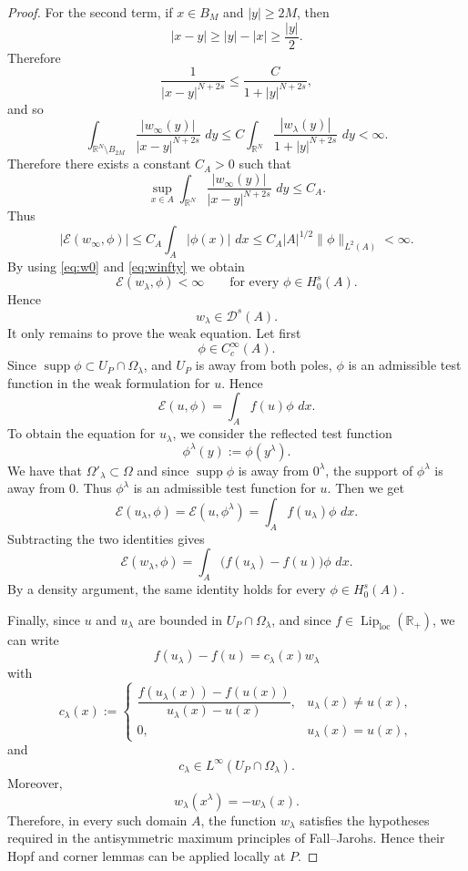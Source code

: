 \documentclass[11pt,a4paper]{article}
\newcommand{\dd}{\,d}
\newcommand{\supp}{\operatorname{supp}}
\newcommand{\Lip}{\operatorname{Lip}}
\newcommand{\loc}{\mathrm{loc}}
\begin{document}
\begin{proof}
For the second term, if \(x\in B_M\) and \(|y|\ge 2M\), then
\[
|x-y|\ge |y|-|x|\ge \frac{|y|}{2}.
\]
Therefore
\[
\frac1{|x-y|^{N+2s}}
\le
\frac{C}{1+|y|^{N+2s}},
\]
and so
\[
\int_{\mathbb R^N\setminus B_{2M}}
\frac{|w_\infty(y)|}{|x-y|^{N+2s}}\,\dd y
\le
C
\int_{\mathbb R^N}
\frac{|w_\lambda(y)|}{1+|y|^{N+2s}}\,\dd y
<\infty.
\]
Therefore there exists a constant \(C_{A}>0\) such that
\[
\sup_{x\in A}
\int_{\mathbb R^N}
\frac{|w_\infty(y)|}{|x-y|^{N+2s}}\,\dd y
\le C_{A}.
\]
Thus
\begin{equation}\label{eq:winfty}
|\mathcal E(w_\infty,\phi)|
\le
C_{A}\int_{A}|\phi(x)|\,\dd x
\le
C_{A}|A|^{1/2}\|\phi\|_{L^2(A)}
<\infty.
\end{equation}
By using \eqref{eq:w0} and \eqref{eq:winfty} we obtain
\[
\mathcal E(w_\lambda,\phi)<\infty
\qquad
\text{for every }\phi\in H^s_0(A).
\]
Hence
\[
w_\lambda\in \mathcal{D}^{s}(A).
\]
It only remains to prove the weak equation. Let first
\[
\phi\in C_c^\infty(A).
\]
Since \(\supp\phi\subset U_P\cap\Omega_\lambda\), and \(U_P\) is away from both
poles, \(\phi\) is an admissible test function in the weak formulation for
\(u\). Hence
\[
\mathcal E(u,\phi)
=
\int_{A}f(u)\phi\,\dd x.
\]
To obtain the equation for \(u_\lambda\), we consider the reflected test function
\[
\phi^\lambda(y):=\phi(y^\lambda).
\]
We have that \(\Omega'_\lambda\subset\Omega\)
and since \(\supp\phi\) is away from \(0^\lambda\), the support of
\(\phi^\lambda\) is away from \(0\). Thus \(\phi^\lambda\) is an admissible test
function for \(u\). Then we get
\[
\mathcal E(u_\lambda,\phi)
=
\mathcal E(u,\phi^\lambda)
=
\int_{A}f(u_\lambda)\phi\,\dd x.
\]
Subtracting the two identities gives
\[
\mathcal E(w_\lambda,\phi)
=
\int_{A}
\bigl(f(u_\lambda)-f(u)\bigr)\phi\,\dd x.
\]
By a density argument, the same identity holds for every
\(\phi\in H^s_0(A)\).

Finally, since \(u\) and \(u_\lambda\) are bounded in \(U_P\cap\Omega_\lambda\),
and since \(f\in\Lip_{\loc}(\mathbb R_+)\), we can write
\[
f(u_\lambda)-f(u)=c_\lambda(x)w_\lambda
\]
with
\[
c_\lambda(x):=
\begin{cases}
\dfrac{f(u_\lambda(x))-f(u(x))}
{u_\lambda(x)-u(x)},
& u_\lambda(x)\neq u(x),\\[2ex]
0,
& u_\lambda(x)=u(x),
\end{cases}
\]
and
\[
c_\lambda\in L^\infty(U_P\cap\Omega_\lambda).
\]
Moreover,
\[
w_\lambda(x^\lambda)=-w_\lambda(x).
\]
Therefore, in every such domain \(A\), the function
\(w_\lambda\) satisfies the hypotheses required in
the antisymmetric maximum principles of Fall--Jarohs. Hence their Hopf and
corner lemmas can be applied locally at \(P\).
\end{proof}
\end{document}
